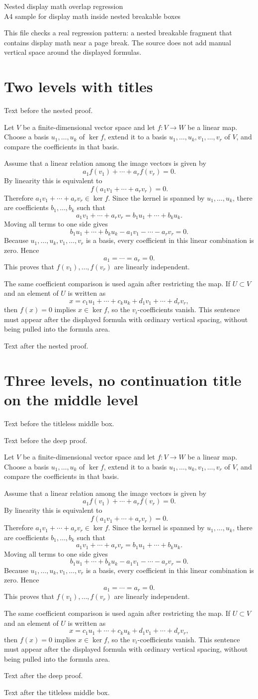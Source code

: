 \documentclass[a4paper,10pt]{article}
\newcommand{\algebrablock}{%
Let \(V\) be a finite-dimensional vector space and let \(f:V\to W\) be a
linear map. Choose a basis \(u_1,\dots,u_k\) of \(\ker f\), extend it to a
basis \(u_1,\dots,u_k,v_1,\dots,v_r\) of \(V\), and compare the coefficients
in that basis.

Assume that a linear relation among the image vectors is given by
\[
  a_1f(v_1)+\cdots+a_rf(v_r)=0.
\]
By linearity this is equivalent to
\[
  f(a_1v_1+\cdots+a_rv_r)=0.
\]
Therefore \(a_1v_1+\cdots+a_rv_r\in\ker f\). Since the kernel is spanned by
\(u_1,\dots,u_k\), there are coefficients \(b_1,\dots,b_k\) such that
\[
  a_1v_1+\cdots+a_rv_r=b_1u_1+\cdots+b_ku_k.
\]
Moving all terms to one side gives
\[
  b_1u_1+\cdots+b_ku_k-a_1v_1-\cdots-a_rv_r=0.
\]
Because \(u_1,\dots,u_k,v_1,\dots,v_r\) is a basis, every coefficient in this
linear combination is zero. Hence
\[
  a_1=\cdots=a_r=0.
\]
This proves that \(f(v_1),\dots,f(v_r)\) are linearly independent.

The same coefficient comparison is used again after restricting the map. If
\(U\subset V\) and an element of \(U\) is written as
\[
  x=c_1u_1+\cdots+c_ku_k+d_1v_1+\cdots+d_rv_r,
\]
then \(f(x)=0\) implies \(x\in\ker f\), so the \(v_i\)-coefficients vanish.
This sentence must appear after the displayed formula with ordinary vertical
spacing, without being pulled into the formula area.
}
\begin{document}
\begin{center}
{\Large Nested display math overlap regression}\\[2mm]
{\small A4 sample for display math inside nested breakable boxes}
\end{center}

This file checks a real regression pattern: a nested breakable fragment that
contains display math near a page break. The source does not add manual
vertical space around the displayed formulas.

\section*{Two levels with titles}

\lipsum[1-4]

\begin{outerproofbox}[title={Outer proof box}]
Text before the nested proof.

\begin{innerproofbox}[title={Inner proof box},notitle after break]
\algebrablock

\lipsum[5-8]
\end{innerproofbox}

Text after the nested proof.
\end{outerproofbox}

\section*{Three levels, no continuation title on the middle level}

\begin{outerproofbox}[title={Outer proof box},notitle after break]
Text before the titleless middle box.

\begin{innerproofbox}
Text before the deep proof.

\begin{deepproofbox}[title={Deep proof box},notitle after break]
\algebrablock

\lipsum[9-12]
\end{deepproofbox}

Text after the deep proof.
\end{innerproofbox}

Text after the titleless middle box.
\end{outerproofbox}
\end{document}
